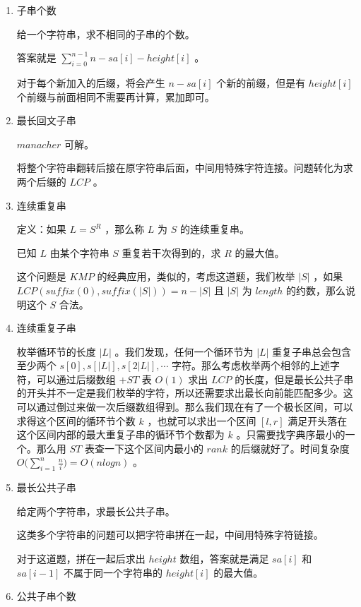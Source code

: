\documentclass[11pt]{article}
\begin{document}
\begin{enumerate}
\item 子串个数
\label{sec-5-3-3-4}

给一个字符串，求不相同的子串的个数。

答案就是 $\sum_ {i = 0} ^ {n - 1} n - sa[i] - height[i]$ 。

对于每个新加入的后缀，将会产生 $n-sa[i]$ 个新的前缀，但是有 $height[i]$ 个前缀与前面相同不需要再计算，累加即可。

\item 最长回文子串
\label{sec-5-3-3-5}

$manacher$ 可解。

将整个字符串翻转后接在原字符串后面，中间用特殊字符连接。问题转化为求两个后缀的 $LCP$ 。

\item 连续重复串
\label{sec-5-3-3-6}

定义：如果 $L=S^R$ ，那么称 $L$ 为 $S$ 的连续重复串。

已知 $L$ 由某个字符串 $S$ 重复若干次得到的，求 $R$ 的最大值。

这个问题是 $KMP$ 的经典应用，类似的，考虑这道题，我们枚举 $|S|$ ，如果 $LCP(suffix(0),suffix(|S|))=n-|S|$ 且 $|S|$ 为 $length$ 的约数，那么说明这个 $S$ 合法。

\item 连续重复子串
\label{sec-5-3-3-7}

枚举循环节的长度 $|L|$ 。我们发现，任何一个循环节为  $|L|$ 重复子串总会包含至少两个 $s[0],s[|L|],s[2|L|], \cdots$  字符。那么考虑枚举两个相邻的上述字符，可以通过后缀数组 $+ST$ 表 $O(1)$ 求出 $LCP$ 的长度，但是最长公共子串的开头并不一定是我们枚举的字符，所以还需要求出最长向前能匹配多少。这可以通过倒过来做一次后缀数组得到。那么我们现在有了一个极长区间，可以求得这个区间的循环节个数 $k$ ，也就可以求出一个区间 $[l,r]$ 满足开头落在这个区间内部的最大重复子串的循环节个数都为 $k$ 。只需要找字典序最小的一个。那么用 $ST$ 表查一下这个区间内最小的 $rank$ 的后缀就好了。时间复杂度 $O\Big(\sum_{i=1}^{n}\frac{n}{i}\Big)=O(nlogn)$ 。

\item 最长公共子串
\label{sec-5-3-3-8}

给定两个字符串，求最长公共子串。

这类多个字符串的问题可以把字符串拼在一起，中间用特殊字符链接。

对于这道题，拼在一起后求出 $height$ 数组，答案就是满足 $sa[i]$ 和 $sa[i-1]$ 不属于同一个字符串的 $height[i]$ 的最大值。

\item 公共子串个数
\label{sec-5-3-3-9}


\end{enumerate}
\end{document}
